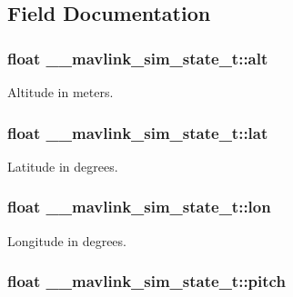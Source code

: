 \subsection{Field Documentation}
\hypertarget{struct____mavlink__sim__state__t_a2a8b47ade532ffc0a80aed65972d61f6}{
\subsubsection[{alt}]{\setlength{\rightskip}{0pt plus 5cm}float \+\_\+\+\_\+mavlink\+\_\+sim\+\_\+state\+\_\+t\+::alt}}\label{struct____mavlink__sim__state__t_a2a8b47ade532ffc0a80aed65972d61f6}


Altitude in meters. 

\hypertarget{struct____mavlink__sim__state__t_a0f160cde80e89d62a8e1224646c6d2f9}{
\subsubsection[{lat}]{\setlength{\rightskip}{0pt plus 5cm}float \+\_\+\+\_\+mavlink\+\_\+sim\+\_\+state\+\_\+t\+::lat}}\label{struct____mavlink__sim__state__t_a0f160cde80e89d62a8e1224646c6d2f9}


Latitude in degrees. 

\hypertarget{struct____mavlink__sim__state__t_abe7f252d4e917f15f5267b57a607d980}{
\subsubsection[{lon}]{\setlength{\rightskip}{0pt plus 5cm}float \+\_\+\+\_\+mavlink\+\_\+sim\+\_\+state\+\_\+t\+::lon}}\label{struct____mavlink__sim__state__t_abe7f252d4e917f15f5267b57a607d980}


Longitude in degrees. 

\hypertarget{struct____mavlink__sim__state__t_acec861e9f5f2b6f85150a4c588abcf84}{
\subsubsection[{pitch}]{\setlength{\rightskip}{0pt plus 5cm}float \+\_\+\+\_\+mavlink\+\_\+sim\+\_\+state\+\_\+t\+::pitch}}\label{struct____mavlink__sim__state__t_acec861e9f5f2b6f85150a4c588abcf84}


